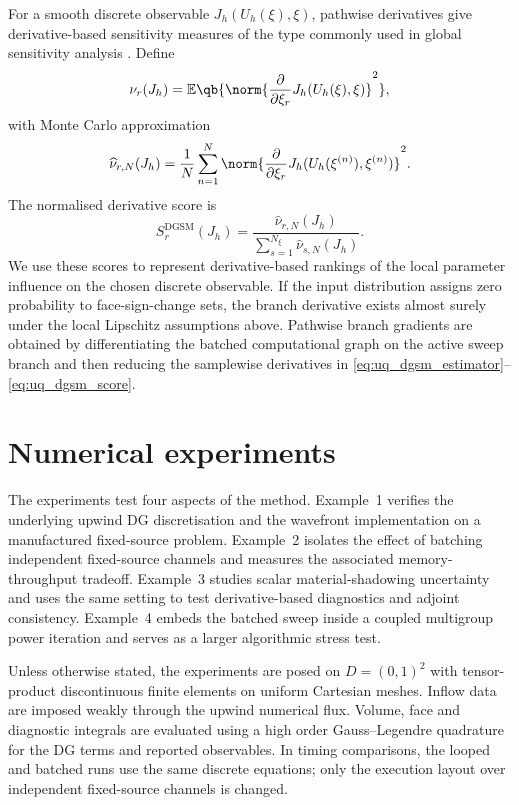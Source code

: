 \documentclass[final]{amsart}
\begin{document}
For a smooth discrete observable $J_h(U_h(\xi),\xi)$, pathwise
derivatives give derivative-based sensitivity measures of the type
commonly used in global sensitivity analysis
\cite{SobolKucherenko2009DGSM,Cacuci2003}. Define
\begin{equation}
  \nu_r(J_h)
  =
  \mathbb{E}
  \qb{
    \norm{
      \frac{\partial}{\partial \xi_r}
      J_h(U_h(\xi),\xi)
    }^2
  },
  \label{eq:uq_dgsm_raw}
\end{equation}
with Monte Carlo approximation
\begin{equation}
  \widehat{\nu}_{r,N}(J_h)
  =
  \frac{1}{N}
  \sum_{n=1}^{N}
  \norm{
    \frac{\partial}{\partial \xi_r}
    J_h(U_h(\xi^{(n)}),\xi^{(n)})
  }^2.
  \label{eq:uq_dgsm_estimator}
\end{equation}
The normalised derivative score is
\begin{equation}
  S_r^{\mathrm{DGSM}}(J_h)
  =
  \frac{
    \widehat{\nu}_{r,N}(J_h)
  }{
    \sum_{s=1}^{N_\xi}
    \widehat{\nu}_{s,N}(J_h)
  }.
  \label{eq:uq_dgsm_score}
\end{equation}
We use these scores to represent derivative-based rankings of the
local parameter influence on the chosen discrete observable. If the
input distribution assigns zero probability to face-sign-change sets,
the branch derivative exists almost surely under the local Lipschitz
assumptions above. Pathwise branch gradients are obtained by
differentiating the batched computational graph on the active sweep
branch and then reducing the samplewise derivatives in
\eqref{eq:uq_dgsm_estimator}--\eqref{eq:uq_dgsm_score}.

\section{Numerical experiments}
\label{sec:numerics}

The experiments test four aspects of the method. Example~1 verifies the
underlying upwind DG discretisation and the wavefront implementation on
a manufactured fixed-source problem. Example~2 isolates the effect of
batching independent fixed-source channels and measures the associated
memory-throughput tradeoff. Example~3 studies scalar material-shadowing
uncertainty and uses the same setting to test derivative-based
diagnostics and adjoint consistency. Example~4 embeds the batched sweep
inside a coupled multigroup power iteration and serves as a larger
algorithmic stress test.

Unless otherwise stated, the experiments are posed on
$D=(0,1)^2$ with tensor-product discontinuous finite elements on
uniform Cartesian meshes. Inflow data are imposed weakly through the
upwind numerical flux. Volume, face and diagnostic integrals are
evaluated using a high order Gauss--Legendre quadrature for the DG
terms and reported observables. In timing comparisons, the looped and
batched runs use the same discrete equations; only the execution
layout over independent fixed-source channels is changed.
\end{document}
